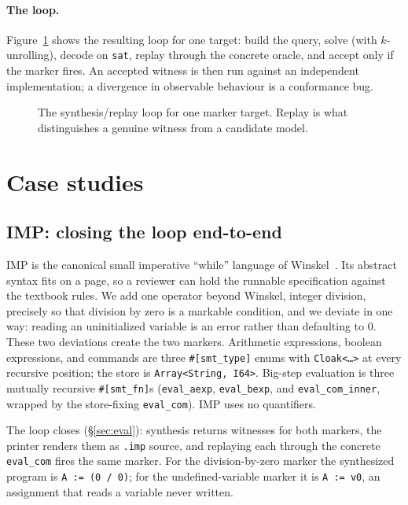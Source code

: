 \documentclass[11pt,a4paper]{article}
\theoremstyle{definition}
\theoremstyle{remark}
\newcommand{\imp}{IMP}
\newcommand{\code}[1]{\texttt{#1}}
\begin{document}
\paragraph{The loop.}
Figure~\ref{fig:loop} shows the resulting loop for one target: build the query,
solve (with $k$-unrolling), decode on \code{sat}, replay through the concrete
oracle, and accept only if the marker fires. An accepted witness is then run
against an independent implementation; a divergence in observable behaviour is a
conformance bug.

\begin{figure}[t]
\centering
\resizebox{\textwidth}{!}{}
\caption{The synthesis/replay loop for one marker target. Replay is what
distinguishes a genuine witness from a candidate model.}
\label{fig:loop}
\end{figure}

\section{Case studies}
\label{sec:cases}

\subsection{\imp{}: closing the loop end-to-end}
\label{sec:imp}

\imp{} is the canonical small imperative ``while'' language of
Winskel~\cite{winskel1993}. Its abstract syntax fits on a page, so a reviewer can
hold the runnable specification against the textbook rules. We add one operator
beyond Winskel, integer division, precisely so that division by zero is a
markable condition, and we deviate in one way: reading an uninitialized variable
is an error rather than defaulting to $0$. These two deviations create the two
markers. Arithmetic expressions, boolean expressions, and commands are three
\code{\#[smt\_type]} enums with \code{Cloak<\dots>} at every recursive position;
the store is \code{Array<String, I64>}. Big-step evaluation is three mutually
recursive \code{\#[smt\_fn]}s (\code{eval\_aexp}, \code{eval\_bexp}, and
\code{eval\_com\_inner}, wrapped by the store-fixing \code{eval\_com}). \imp{}
uses no quantifiers.

The loop closes (\S\ref{sec:eval}): synthesis returns witnesses for both markers,
the printer renders them as \code{.imp} source, and replaying each through the
concrete \code{eval\_com} fires the same marker. For the division-by-zero marker
the synthesized program is \code{A := (0 / 0)}; for the undefined-variable marker
it is \code{A := v0}, an assignment that reads a variable never written.
\end{document}
